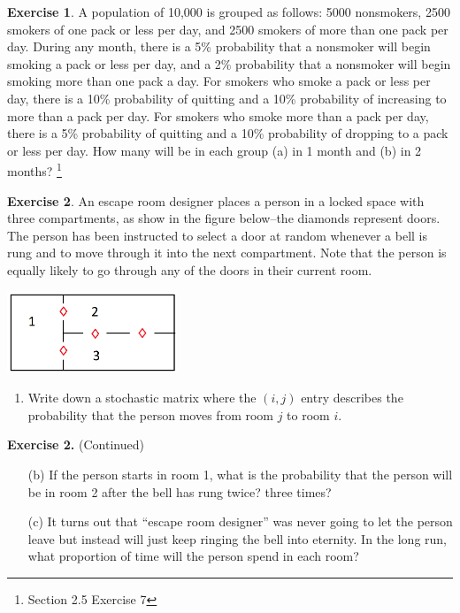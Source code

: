 \documentclass[handout]{beamer}
\newcommand{\fn}{\insertframenumber}
\theoremstyle{definition}
\newtheorem{exercise}{Exercise}
\begin{document}
\begin{frame}{\fn}
	\begin{exercise}
		A population of 10,000 is grouped as follows: 5000 nonsmokers, 2500 smokers of one pack or less per day, and 2500 smokers of more than one pack per day.  During any month, there is a 5\% probability that a nonsmoker will begin smoking a pack or less per day, and a 2\% probability that a nonsmoker will begin smoking more than one pack a day.  For smokers who smoke a pack or less per day, there is a 10\% probability of quitting and a 10\% probability of increasing to more than a pack per day.  For smokers who smoke more than a pack per day, there is a 5\% probability of quitting and a 10\% probability of dropping to a pack or less per day.  How many will be in each group (a) in 1 month and (b) in 2 months?
		\footnote{Section 2.5 Exercise 7}
	\end{exercise}
\end{frame}
\begin{frame}{\fn}
\begin{exercise}
	An escape room designer places a person in a locked space with three compartments, as show in the figure below--the diamonds represent doors.  The person has been instructed to select a door at random whenever a bell is rung and to move through it into the next compartment. Note that the person is equally likely to go through any of the doors in their current room.
	\begin{center}
	\includegraphics[width=2in]{images/markov1}
	\end{center}
	\begin{enumerate}[label=(\alph*)]
		\item Write down a stochastic matrix where the $(i,j)$ entry describes the probability that the person moves from room $j$ to room $i$.
	\end{enumerate}
\end{exercise}
\end{frame}
\begin{frame}{\fn}
\begin{block}{\textbf{Exercise 2.} (Continued)}
	\begin{enumerate}[label=(\alph*)]
		\item[(b)] If the person starts in room 1, what is the probability that the person will be in room 2 after the bell has rung twice? three times?\pause
		\item[(c)] It turns out that ``escape room designer'' was never going to let the person leave but instead will just keep ringing the bell into eternity.  In the long run, what proportion of time will the person spend in each room?
	\end{enumerate}
\end{block}
\end{frame}
\end{document}
